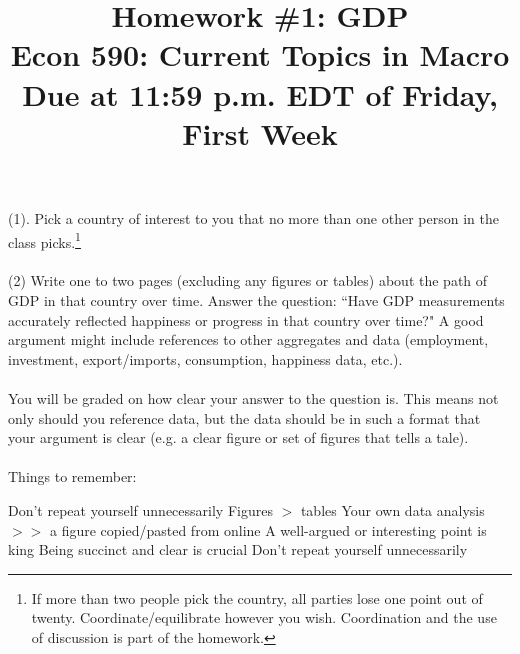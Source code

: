 \documentclass[a4paper]{article}
\title{{\Large \bf Homework \#1: GDP} \\ \small Econ 590: Current Topics in Macro \\ \small Due at  11:59 p.m. EDT of Friday, First Week}
\date{}
\renewcommand{\item}{\itemindent1cm\itemold}
\begin{document}
\maketitle
 
\noindent
(1). Pick a country of interest to you that no more than one other person in the class picks.\footnote{If more than two people pick the country, all parties lose one point out of twenty.  Coordinate/equilibrate however you wish.  Coordination and the use of discussion is part of the homework.}\\
\ \\
(2) Write one to two pages (excluding any figures or tables) about the path of GDP in that country over time.  Answer the question: ``Have GDP measurements accurately reflected happiness or progress in that country over time?"  A good argument might include references to other aggregates and data (employment, investment, export/imports, consumption, happiness data, etc.).\\
\ \\
You will be graded on how clear your answer to the question is.   This means not only should you reference data, but the data should be in such a format that your argument is clear (e.g. a clear figure or set of figures that tells a tale).  \\
\ \\
Things to remember:
\begin{itemize}
\item Don't repeat yourself unnecessarily
\item Figures $>$ tables
\item Your own data analysis $>>$ a figure copied/pasted from online
\item A well-argued or interesting point is king
\item Being succinct and clear is crucial
\item Don't repeat yourself unnecessarily
\end{itemize}
\end{document}
